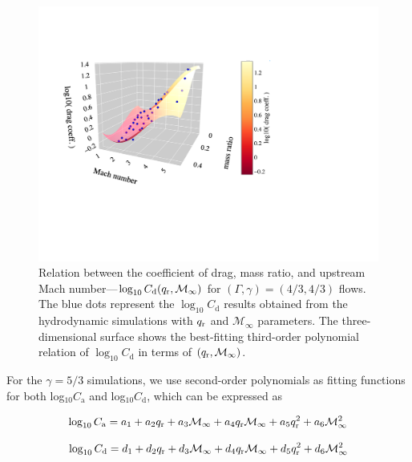 \begin{figure}
  \centering
  \includegraphics[width=14cm]{figures/common_envelope/logdrag_order3_g43_inc_mdotdrag.pdf}
\caption{Relation between the coefficient of drag, mass ratio, and upstream Mach number---$\log_{10}C_{\mathrm d} (q_{\rm r}, \mathcal{M}_\infty)$ for $(\Gamma, \gamma) = (4/3, 4/3)$ flows. The blue dots represent the $\log_{10}C_{\mathrm d}$ results obtained from the hydrodynamic simulations with $q_{\rm r}$ and $\mathcal{M}_\infty$ parameters. The three-dimensional surface shows the best-fitting third-order polynomial relation of $\log_{10}C_{\mathrm d}$ in terms of $(q_{\rm r}, \mathcal{M}_\infty)$.\label{fig:logdrag_g43}}
\end{figure}

For the $\gamma=5/3$ simulations, we use second-order polynomials as fitting functions for both log$_{10}C_{\mathrm a}$  and log$_{10}C_{\mathrm d}$, which can be expressed as

\begin{equation}
\label{eq:logmdot_g53}
\begin{split}
\log_{10} C_{\mathrm a} = a_1 + a_2 q_{\rm r} + a_3 \mathcal{M}_\infty + a_4 q_{\rm r}\mathcal{M}_\infty + a_5 q_{\rm r}^2 + a_6 \mathcal{M}_\infty^2
\end{split}
\end{equation}

\begin{equation}
\label{eq:logdrag_g53}
\begin{split}
\log_{10} C_{\mathrm d} = d_1 + d_2 q_{\rm r} + d_3 \mathcal{M}_\infty + d_4 q_{\rm r}\mathcal{M}_\infty + d_5 q_{\rm r}^2 + d_6 \mathcal{M}_\infty^2
\end{split}
\end{equation}

